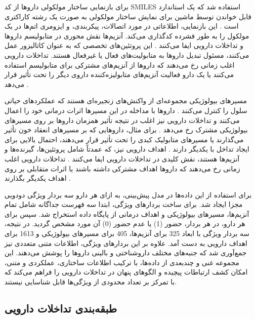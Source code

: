 برای بازنمایی ساختار مولکولی داروها از کد SMILES استفاده شد که یک استاندارد قابل خواندن توسط ماشین برای نمایش ساختار مولکولی به صورت یک رشته کاراکتری است \cite{ref_weininger1988}. این بازنمایی، اطلاعاتی در مورد اتصالات، پیکربندی، و ایزومری اتم‌ها در یک مولکول را به طور فشرده کدگذاری می‌کند. آنزیم‌ها نقش محوری در متابولیسم داروها و تداخلات دارویی ایفا می‌کنند \cite{ref_cascorbi2012}. این پروتئین‌های تخصصی که به عنوان کاتالیزور عمل می‌کنند، مسئول تبدیل داروها به متابولیت‌های فعال یا غیرفعال هستند. تداخلات دارویی اغلب زمانی رخ می‌دهند که داروها از آنزیم‌های مشترکی برای متابولیسم استفاده می‌کنند یا یک دارو فعالیت آنزیم‌های متابولیزه‌کننده داروی دیگر را تحت تأثیر قرار می‌دهد \cite{ref_huang2013}.

مسیرهای بیولوژیکی مجموعه‌ای از واکنش‌های زنجیره‌ای هستند که عملکردهای حیاتی سلول را کنترل می‌کنند \cite{ref_kegg}. داروها با مداخله در این مسیرها اثرات درمانی خود را اعمال می‌کنند و تداخلات دارویی نیز اغلب در نتیجه تأثیر همزمان داروها بر روی مسیرهای بیولوژیکی مشترک رخ می‌دهد \cite{ref_huang2013}. برای مثال، داروهایی که بر مسیرهای انعقاد خون تأثیر می‌گذارند یا مسیرهای متابولیک کبدی را تحت تأثیر قرار می‌دهند، احتمال بالایی برای ایجاد تداخل با یکدیگر دارند \cite{ref_ryu2018}. اهداف دارویی نیز، که عمدتاً شامل پروتئین‌ها، گیرنده‌ها و آنزیم‌ها هستند، نقش کلیدی در تداخلات دارویی ایفا می‌کنند \cite{ref_drugbank}. تداخلات دارویی اغلب زمانی رخ می‌دهند که داروها اهداف مشترکی داشته باشند یا اثرات متقابلی بر روی اهداف یکدیگر بگذارند \cite{ref_glintborg2005}.

برای استفاده از این داده‌ها در مدل پیش‌بینی، به ازای هر دارو سه بردار ویژگی دودویی مجزا ایجاد شد. برای ساخت بردارهای ویژگی، ابتدا سه فهرست جداگانه شامل تمام آنزیم‌ها، مسیرهای بیولوژیکی و اهداف درمانی از پایگاه داده استخراج شد. سپس برای هر دارو، در هر بردار، حضور (1) یا عدم حضور (0) آن مورد مشخص گردید. در نتیجه، سه بردار ویژگی با ابعاد 325 برای آنزیم‌ها، 405 برای مسیرهای بیولوژیکی و 1613 برای اهداف دارویی به دست آمد. علاوه بر این بردارهای ویژگی، اطلاعات متنی متعددی نیز جمع‌آوری شد که جنبه‌های مختلف داروشناختی و بالینی داروها را پوشش می‌دهند. این مجموعه غنی و چندبعدی از داده‌ها، با ترکیب اطلاعات ساختاری، عملکردی و متنی، امکان کشف ارتباطات پیچیده و الگوهای پنهان در تداخلات دارویی را فراهم می‌کند که با تمرکز بر تعداد محدودی از ویژگی‌ها قابل شناسایی نیستند.

\subsection{طبقه‌بندی تداخلات دارویی}


